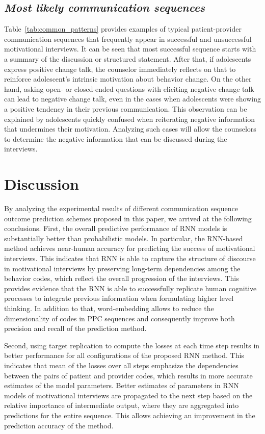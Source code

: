 \documentclass{amia_summit_2018}
\begin{document}
\subsection*{\textit{Most likely communication sequences}}
Table~\ref{tab:common_patterns} provides examples of typical patient-provider communication sequences that frequently appear in successful and unsuccessful motivational interviews. It can be seen that most successful sequence starts with a summary of the discussion or structured statement. After that, if adolescents express positive change talk, the counselor immediately reflects on that to reinforce adolescent's intrinsic motivation about behavior change. On the other hand, asking open- or closed-ended questions with eliciting negative change talk can lead to negative change talk, even in the cases when adolescents were showing a positive tendency in their previous communication. This observation can be explained by adolescents quickly confused when reiterating negative information that undermines their motivation. Analyzing such cases will allow the counselors to determine the negative information that can be discussed during the interviews.

\section*{Discussion}
By analyzing the experimental results of different communication sequence outcome prediction schemes proposed in this paper, we arrived at the following conclusions. First, the overall predictive performance of RNN models is substantially better than probabilistic models. In particular, the RNN-based method achieves near-human accuracy for predicting the success of motivational interviews. This indicates that RNN is able to capture the structure of discourse in motivational interviews by preserving long-term dependencies among the behavior codes, which reflect the overall progression of the interviews. This provides evidence that the RNN is able to successfully replicate human cognitive processes to integrate previous information when formulating higher level thinking. In addition to that, word-embedding allows to reduce the dimensionality of codes in PPC sequences and consequently improve both precision and recall of the prediction method. 

Second, using target replication to compute the losses at each time step results in better performance for all configurations of the proposed RNN method. This indicates that mean of the losses over all steps emphasize the dependencies between the pairs of patient and provider codes, which results in more accurate estimates of the model parameters. Better estimates of parameters in RNN models of motivational interviews are propagated to the next step based on the relative importance of intermediate output, where they are aggregated into predictions for the entire sequence. This allows achieving an improvement in the prediction accuracy of the method. 
\end{document}
